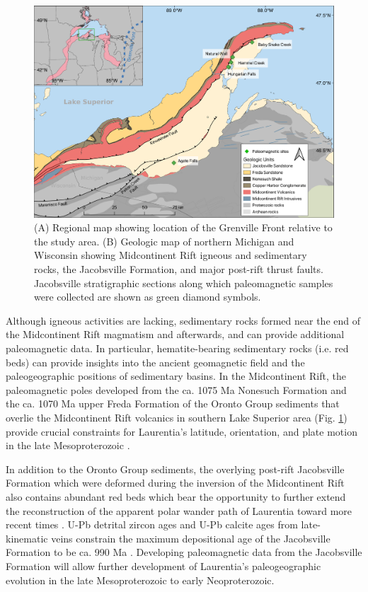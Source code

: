\documentclass[draft]{agujournal2019}
\begin{document}
\begin{figure}[h!]
\centering
\includegraphics[width=\textwidth]{Geologic_map.pdf}
\caption{(A) Regional map showing location of the Grenville Front relative to the study area. (B) Geologic map of northern Michigan and Wisconsin showing Midcontinent Rift igneous and sedimentary rocks, the Jacobsville Formation, and major post-rift thrust faults. Jacobsville stratigraphic sections along which paleomagnetic samples were collected are shown as green diamond symbols.}
\label{fig:Geologic_map}
\end{figure}

Although igneous activities are lacking, sedimentary rocks formed near the end of the Midcontinent Rift magmatism and afterwards, and can provide additional paleomagnetic data. In particular, hematite-bearing sedimentary rocks (i.e. red beds) can provide insights into the ancient geomagnetic field and the paleogeographic positions of sedimentary basins. In the Midcontinent Rift, the paleomagnetic poles developed from the ca. 1075 Ma Nonesuch Formation and the ca. 1070 Ma upper Freda Formation of the Oronto Group sediments that overlie the Midcontinent Rift volcanics in southern Lake Superior area (Fig. \ref{fig:Geologic_map}) provide crucial constraints for Laurentia's latitude, orientation, and plate motion in the late Mesoproterozoic \cite{Henry1977a}. 

In addition to the Oronto Group sediments, the overlying post-rift Jacobsville Formation which were deformed during the inversion of the Midcontinent Rift also contains abundant red beds which bear the opportunity to further extend the reconstruction of the apparent polar wander path of Laurentia toward more recent times \cite{Hamblin1958a, Hodgin2022a}. U-Pb detrital zircon ages and U-Pb calcite ages from late-kinematic veins constrain the maximum depositional age of the Jacobsville Formation to be ca. 990 Ma \cite{Hodgin2022a}. Developing paleomagnetic data from the Jacobsville Formation will allow further development of Laurentia's paleogeographic evolution in the late Mesoproterozoic to early Neoproterozoic. 
\end{document}

